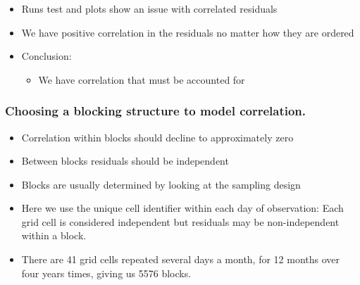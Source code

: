 \documentclass[11pt, a4paper]{article}
\begin{document}
\begin{frame}
\frametitle{}
\begin{itemize}
\item Runs test and plots show an issue with correlated residuals
\item We have positive correlation in the residuals no matter how they are ordered
\bigskip
\item Conclusion:  
\begin{itemize}
  \item We have correlation that must be accounted for
\end{itemize}
\end{itemize}
\end{frame}

\begin{frame}
\frametitle{Choosing a blocking structure to model correlation.}
\begin{itemize}
\item Correlation within blocks should decline to approximately zero 
\item Between blocks residuals should be independent
\item Blocks are usually determined by looking at the sampling design
\item Here we use the unique cell identifier within each day of observation: Each grid cell is considered independent but residuals may be non-independent within a block.
\item There are 41 grid cells repeated several days a month, for 12 months over four years times, giving us 5576 blocks.
\end{itemize}
\end{frame}
\end{document}
